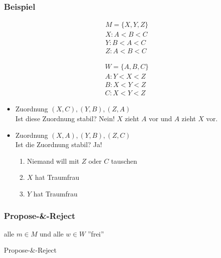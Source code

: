 \documentclass{scrartcl}
\begin{document}
\subsubsection{Beispiel}

\begin{minipage}{.5\linewidth}
	\begin{align*}
		M = \{ X,Y,Z \} \\
		X: A < B < C \\
		Y: B < A < C \\
		Z: A < B < C
	\end{align*}
\end{minipage}
\begin{minipage}{.5\linewidth}
	\begin{align*}
		W = \{ A,B,C \} \\
		A: Y < X < Z \\
		B: X < Y < Z \\
		C: X < Y < Z
	\end{align*}
\end{minipage}

\begin{itemize}
	\item Zuordnung $ (X,C),(Y,B),(Z,A) $ \\
	Ist diese Zuordnung stabil? Nein! $ X $ zieht $ A $ vor und $ A $ zieht $ X $ vor.
	\item Zuordnung $ (X,A),(Y,B),(Z,C) $ \\
	Ist die Zuordnung stabil? Ja!
	\begin{enumerate}
		\item Niemand will mit $ Z $ oder $ C $ tauschen
		\item $ X $ hat Traumfrau
		\item $ Y $ hat Traumfrau
	\end{enumerate}
\end{itemize}

\subsubsection{Propose-\&-Reject}

\begin{algorithm}[H]
	alle $ m \in M $ und alle $ w \in W $ ''frei'' \\
	\caption{Propose-\&-Reject}
\end{algorithm}
\end{document}
